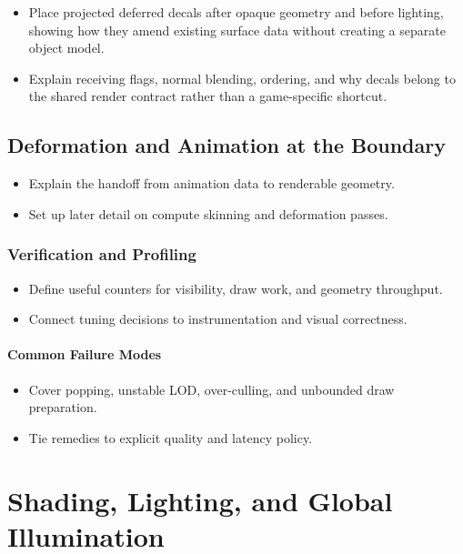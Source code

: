 \documentclass[
  11pt,
  letterpaper,
  DIV=11,
  numbers=noendperiod,
  twoside,
  open=right]{scrreprt}
\providecommand{\tightlist}{%
  \setlength{\itemsep}{0pt}\setlength{\parskip}{0pt}}
\begin{document}
\begin{itemize}
\tightlist
\item
  Place projected deferred decals after opaque geometry and before
  lighting, showing how they amend existing surface data without
  creating a separate object model.
\item
  Explain receiving flags, normal blending, ordering, and why decals
  belong to the shared render contract rather than a game-specific
  shortcut.
\end{itemize}

\section{Deformation and Animation at the
Boundary}\label{deformation-and-animation-at-the-boundary}

\begin{itemize}
\tightlist
\item
  Explain the handoff from animation data to renderable geometry.
\item
  Set up later detail on compute skinning and deformation passes.
\end{itemize}

\subsection{Verification and
Profiling}\label{verification-and-profiling}

\begin{itemize}
\tightlist
\item
  Define useful counters for visibility, draw work, and geometry
  throughput.
\item
  Connect tuning decisions to instrumentation and visual correctness.
\end{itemize}

\subsubsection{Common Failure Modes}\label{common-failure-modes-1}

\begin{itemize}
\tightlist
\item
  Cover popping, unstable LOD, over-culling, and unbounded draw
  preparation.
\item
  Tie remedies to explicit quality and latency policy.
\end{itemize}

\chapter{Shading, Lighting, and Global
Illumination}\label{shading-lighting-and-global-illumination}
\end{document}

